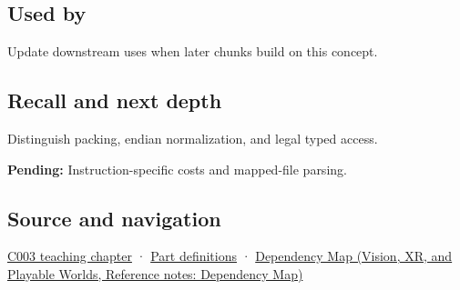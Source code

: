 \subsection{Used by}\label{appendix-0682dbfc5f0e-used-by}

\hypertarget{appendix-0682dbfc5f0e-used-by}{}

Update downstream uses when later chunks build on this concept.

\subsection{Recall and next depth}\label{appendix-0682dbfc5f0e-recall-and-next-depth}

\hypertarget{appendix-0682dbfc5f0e-recall-and-next-depth}{}

Distinguish packing, endian normalization, and legal typed access.

\textbf{Pending:} Instruction-specific costs and mapped-file parsing.

\subsection{Source and navigation}\label{appendix-0682dbfc5f0e-source-and-navigation}

\hypertarget{appendix-0682dbfc5f0e-source-and-navigation}{}

\hyperref[01-foundations-i-ch002-where-the-bytes-live]{C003 teaching chapter} · \hyperref[appendix-fd090d982a15-m003---parts-41-60]{Part definitions} · \href{../07-Vision-XR-and-Playable-Worlds/main.pdf\#nameddest=appendix-4ad47bdd269a}{Dependency Map (Vision, XR, and Playable Worlds, Reference notes: Dependency Map)}
